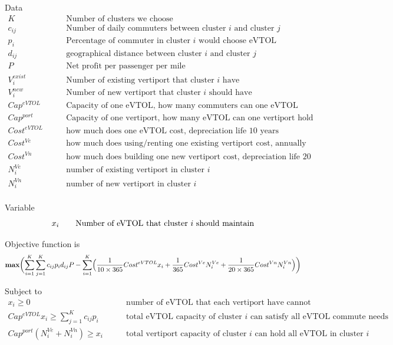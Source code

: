 \documentclass{article}
\begin{document}
Data
\[
\begin{split}
K& \qquad \text{Number of clusters we choose}\\
c_{ij}&  \qquad \text{Number of daily commuters between cluster $i$ and cluster $j$} \\
p_i& \qquad \text{Percentage of commuter in cluster $i$ would choose eVTOL}\\
d_{ij}&  \qquad \text{geographical distance between cluster $i$ and cluster $j$} \\
P & \qquad \text{Net profit per passenger per mile} \\
V^{exist}_i & \qquad \text{Number of existing vertiport that cluster $i$ have} \\
V^{new}_i & \qquad \text{Number of new vertiport that cluster $i$ should have} \\
Cap^{eVTOL} & \qquad \text{Capacity of one eVTOL, how many commuters can one eVTOL hold} \\
Cap^{port} & \qquad \text{Capacity of one vertiport, how many eVTOL can one vertiport hold} \\
Cost^{eVTOL} & \qquad \text{how much does one eVTOL cost, depreciation life 10 years} \\
Cost^{Ve} & \qquad \text{how much does using/renting one existing vertiport cost, annually} \\
Cost^{Vn} & \qquad \text{how much does building one new vertiport cost, depreciation life 20 years} \\
N^{Ve}_i & \qquad \text{number of existing vertiport in cluster $i$} \\
N^{Vn}_i & \qquad \text{number of new vertiport in cluster $i$} \\
\end{split}
\]

Variable
\[
x_{i}  \qquad \text{Number of eVTOL that cluster $i$ should maintain} \\
\]


Objective function is 
\[
\textbf{max} \biggl( \sum_{i=1}^K \sum_{j=1}^K c_{ij}p_i d_{ij}P - \sum_{i=1}^K\Bigl( \frac{1}{10\times365}Cost^{eVTOL}x_i + \frac{1}{365}Cost^{Ve}N^{Ve}_i + \frac{1}{20\times365}Cost^{Vn}N^{Vn}_i  \Bigl)\biggl)
\]

Subject to
\[
\begin{split}
x_i  \geq 0 &\qquad \text{number of eVTOL that each vertiport have cannot be zero}\\
Cap^{eVTOL}x_i \geq \sum_{j=1}^K c_{ij}p_i &\qquad \text{total eVTOL capacity of cluster $i$ can satisfy all eVTOL commute needs} \\
Cap^{port}(N^{Ve}_i+N^{Vn}_i) \geq x_i &\qquad  \text{total vertiport capacity of cluster $i$ can hold all eVTOL in cluster $i$} \\
\end{split}
\]
\end{document}
